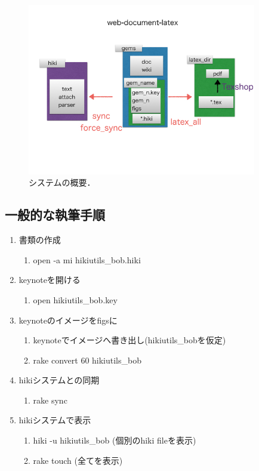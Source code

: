 \begin{figure}[htbp]\begin{center}
\includegraphics[width=10cm,bb= 0 0 737 553]{../figs/./hikiutils_bob.004.jpeg}
\caption{システムの概要．}
\label{default}\end{center}\end{figure}
\subsection{一般的な執筆手順}
\begin{enumerate}
\item 書類の作成
\begin{enumerate}
\item open -a mi hikiutils\_bob.hiki
\end{enumerate}
\item keynoteを開ける
\begin{enumerate}
\item open hikiutils\_bob.key
\end{enumerate}
\item keynoteのイメージをfigsに
\begin{enumerate}
\item keynoteでイメージへ書き出し(hikiutils\_bobを仮定)
\item rake convert 60 hikiutils\_bob
\end{enumerate}
\item hikiシステムとの同期
\begin{enumerate}
\item rake sync
\end{enumerate}
\item hikiシステムで表示
\begin{enumerate}
\item hiki -u hikiutils\_bob (個別のhiki fileを表示)
\item rake touch (全てを表示)
\end{enumerate}
\end{enumerate}
